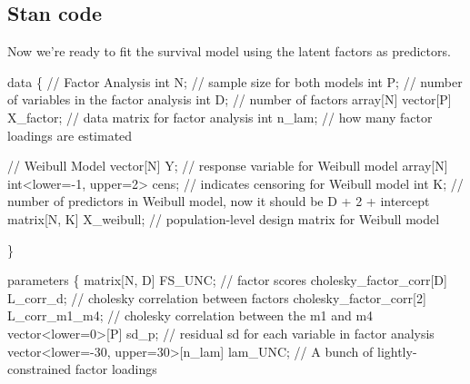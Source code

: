 \documentclass[
  letterpaper,
  DIV=11,
  numbers=noendperiod]{scrreprt}
\newenvironment{Shaded}{\begin{snugshade}}{\end{snugshade}}
\newcommand{\CommentTok}[1]{\textcolor[rgb]{0.37,0.37,0.37}{#1}}
\newcommand{\DataTypeTok}[1]{\textcolor[rgb]{0.68,0.00,0.00}{#1}}
\newcommand{\DecValTok}[1]{\textcolor[rgb]{0.68,0.00,0.00}{#1}}
\newcommand{\KeywordTok}[1]{\textcolor[rgb]{0.00,0.23,0.31}{#1}}
\newcommand{\NormalTok}[1]{\textcolor[rgb]{0.00,0.23,0.31}{#1}}
\begin{document}
\hypertarget{stan-code}{%
\subsection*{Stan code}\label{stan-code}}

Now we're ready to fit the survival model using the latent factors as
predictors.

\begin{Shaded}
\begin{Highlighting}[]
\KeywordTok{data}\NormalTok{ \{}
  \CommentTok{// Factor Analysis}
  \DataTypeTok{int}\NormalTok{ N; }\CommentTok{// sample size for both models}
  \DataTypeTok{int}\NormalTok{ P; }\CommentTok{// number of variables in the factor analysis}
  \DataTypeTok{int}\NormalTok{ D; }\CommentTok{// number of factors}
  \DataTypeTok{array}\NormalTok{[N] }\DataTypeTok{vector}\NormalTok{[P] X\_factor; }\CommentTok{// data matrix for factor analysis}
  \DataTypeTok{int}\NormalTok{ n\_lam; }\CommentTok{// how many factor loadings are estimated}
  
  \CommentTok{// Weibull Model}
  \DataTypeTok{vector}\NormalTok{[N] Y; }\CommentTok{// response variable for Weibull model}
  \DataTypeTok{array}\NormalTok{[N] }\DataTypeTok{int}\NormalTok{\textless{}}\KeywordTok{lower}\NormalTok{={-}}\DecValTok{1}\NormalTok{, }\KeywordTok{upper}\NormalTok{=}\DecValTok{2}\NormalTok{\textgreater{} cens; }\CommentTok{// indicates censoring for Weibull model}
  \DataTypeTok{int}\NormalTok{ K; }\CommentTok{// number of predictors in Weibull model, now it should be D + 2 + intercept}
  \DataTypeTok{matrix}\NormalTok{[N, K] X\_weibull; }\CommentTok{// population{-}level design matrix for Weibull model}
  
\NormalTok{\}}

\KeywordTok{parameters}\NormalTok{ \{}
  \DataTypeTok{matrix}\NormalTok{[N, D] FS\_UNC; }\CommentTok{// factor scores}
  \DataTypeTok{cholesky\_factor\_corr}\NormalTok{[D] L\_corr\_d; }\CommentTok{// cholesky correlation between factors}
  \DataTypeTok{cholesky\_factor\_corr}\NormalTok{[}\DecValTok{2}\NormalTok{] L\_corr\_m1\_m4; }\CommentTok{// cholesky correlation between the m1 and m4}
  \DataTypeTok{vector}\NormalTok{\textless{}}\KeywordTok{lower}\NormalTok{=}\DecValTok{0}\NormalTok{\textgreater{}[P] sd\_p; }\CommentTok{// residual sd for each variable in factor analysis}
  \DataTypeTok{vector}\NormalTok{\textless{}}\KeywordTok{lower}\NormalTok{={-}}\DecValTok{30}\NormalTok{, }\KeywordTok{upper}\NormalTok{=}\DecValTok{30}\NormalTok{\textgreater{}[n\_lam] lam\_UNC; }\CommentTok{// A bunch of lightly{-}constrained factor loadings}
  

\end{Highlighting}
\end{Shaded}
\end{document}
